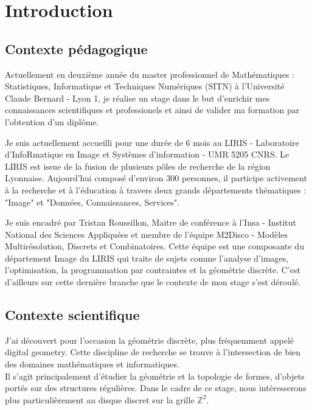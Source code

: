 \section{Introduction}

\subsection{Contexte pédagogique}

Actuellement en deuxième année du master professionnel de Mathématiques : Statistiques, Informatique et Techniques Numériques (SITN) à l’Université Claude Bernard - Lyon 1, je réalise un stage dans le but d'enrichir mes connaissances scientifiques et professionels et ainsi de valider ma formation par l'obtention d'un diplôme.\newline

Je suis actuellement accueilli pour une durée de 6 mois au LIRIS - Laboratoire d'InfoRmatique en Image et Systèmes d'information - UMR 5205 CNRS. Le LIRIS est issue de la fusion de plusieurs pôles de recherche de la région Lyonnaise. Aujourd'hui composé d'environ 300 personnes, il participe activement à la recherche et à l'éducation à travers deux grands départements thématiques : "Image" et "Données, Connaissances, Services".\newline

Je suis encadré par Tristan Roussillon, Maitre de conférence à l'Insa - Institut National des Sciences Appliquées et membre de l'équipe M2Disco - Modèles Multirésolution, Discrets et Combinatoires. Cette équipe est une composante du département Image du LIRIS qui traite de sujets comme l'analyse d'images, l'optimisation, la programmation par contraintes et la géométrie discrète. C'est d'ailleurs sur cette dernière branche que le contexte de mon stage s'est déroulé.



\subsection{Contexte scientifique}

J'ai découvert pour l’occasion la géométrie discrète, plus fréquemment appelé digital geometry. Cette discipline de recherche se trouve à l'intersection de bien des domaines mathématiques et informatiques.\\

   
Il s'agit principalement d'étudier la géométrie et la topologie de formes, d'objets portés sur des structures régulières. Dans le cadre de ce stage, nous intéresserons plus particulièrement au disque discret sur la grille $\mathbb{Z}^{2}$. 
